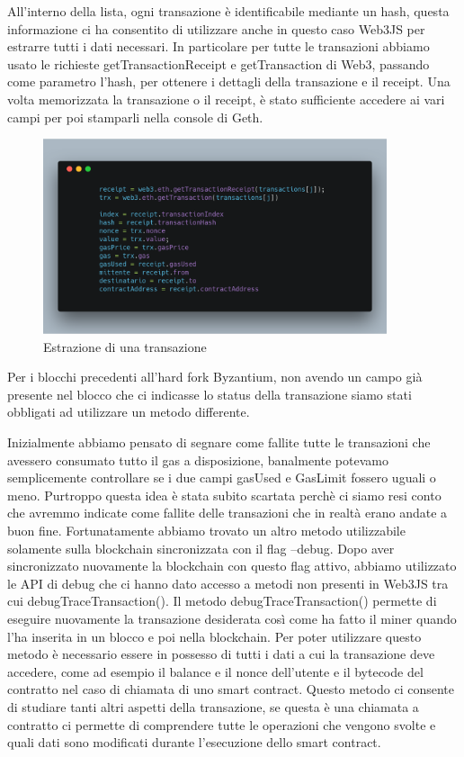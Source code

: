 \documentclass[12pt]{report}
\begin{document}
All'interno della lista, ogni transazione è identificabile mediante un hash, questa informazione ci ha consentito di utilizzare anche in questo caso Web3JS per estrarre tutti i dati necessari.
In particolare per tutte le transazioni abbiamo usato le richieste getTransactionReceipt e getTransaction di Web3, passando come parametro l'hash, per ottenere i dettagli della transazione e il receipt.
Una volta memorizzata la transazione o il receipt, è stato sufficiente accedere ai vari campi per poi stamparli nella console di Geth.

\begin{figure}[H]
    \centering\includegraphics[width=0.9\textwidth]{carbon-20}
    \caption{Estrazione di una transazione}
\end{figure}

Per i blocchi precedenti all'hard fork Byzantium, non avendo un campo già presente nel blocco che ci indicasse lo status della transazione siamo stati obbligati ad utilizzare un metodo differente.

Inizialmente abbiamo pensato di segnare come fallite tutte le transazioni che avessero consumato tutto il gas a disposizione, banalmente potevamo semplicemente controllare se i due campi gasUsed e GasLimit fossero uguali o meno.
Purtroppo questa idea è stata subito scartata perchè ci siamo resi conto che avremmo indicate come fallite delle transazioni che in realtà erano andate a buon fine.
Fortunatamente abbiamo trovato un altro metodo utilizzabile solamente sulla blockchain sincronizzata con il flag --debug.
\newline
Dopo aver sincronizzato nuovamente la blockchain con questo flag attivo, abbiamo utilizzato le API di debug che ci hanno dato accesso a metodi non presenti in Web3JS tra cui debugTraceTransaction().
Il metodo debugTraceTransaction() permette di eseguire nuovamente la transazione desiderata così come ha fatto il miner quando l'ha inserita in un blocco e poi nella blockchain.
Per poter utilizzare questo metodo è necessario essere in possesso di tutti i dati a cui la transazione deve accedere, come ad esempio il balance e il nonce dell'utente e il bytecode del contratto nel caso di chiamata di uno smart contract.
Questo metodo ci consente di studiare tanti altri aspetti della transazione, se questa è una chiamata a contratto ci permette di comprendere tutte le operazioni che vengono svolte e quali dati sono modificati durante l'esecuzione dello smart contract.
\end{document}
